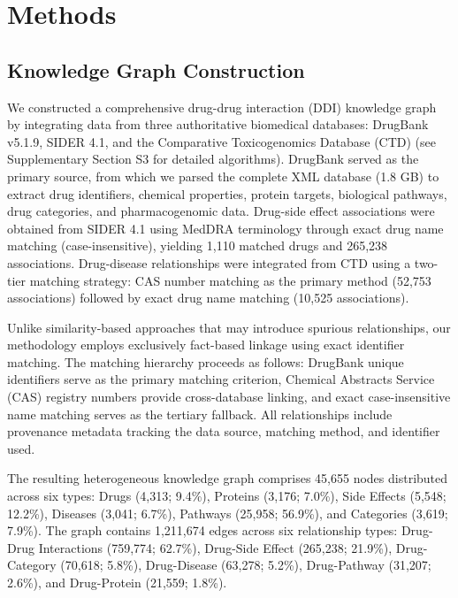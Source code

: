 \documentclass[11pt,a4paper]{article}
\begin{document}
\section*{Methods}

\subsection*{Knowledge Graph Construction}

We constructed a comprehensive drug-drug interaction (DDI) knowledge graph by integrating data from three authoritative biomedical databases: DrugBank v5.1.9, SIDER 4.1, and the Comparative Toxicogenomics Database (CTD) (see Supplementary Section S3 for detailed algorithms). DrugBank served as the primary source, from which we parsed the complete XML database (1.8 GB) to extract drug identifiers, chemical properties, protein targets, biological pathways, drug categories, and pharmacogenomic data. Drug-side effect associations were obtained from SIDER 4.1 using MedDRA terminology through exact drug name matching (case-insensitive), yielding 1,110 matched drugs and 265,238 associations. Drug-disease relationships were integrated from CTD using a two-tier matching strategy: CAS number matching as the primary method (52,753 associations) followed by exact drug name matching (10,525 associations).

Unlike similarity-based approaches that may introduce spurious relationships, our methodology employs exclusively fact-based linkage using exact identifier matching. The matching hierarchy proceeds as follows: DrugBank unique identifiers serve as the primary matching criterion, Chemical Abstracts Service (CAS) registry numbers provide cross-database linking, and exact case-insensitive name matching serves as the tertiary fallback. All relationships include provenance metadata tracking the data source, matching method, and identifier used.

The resulting heterogeneous knowledge graph comprises 45,655 nodes distributed across six types: Drugs (4,313; 9.4\%), Proteins (3,176; 7.0\%), Side Effects (5,548; 12.2\%), Diseases (3,041; 6.7\%), Pathways (25,958; 56.9\%), and Categories (3,619; 7.9\%). The graph contains 1,211,674 edges across six relationship types: Drug-Drug Interactions (759,774; 62.7\%), Drug-Side Effect (265,238; 21.9\%), Drug-Category (70,618; 5.8\%), Drug-Disease (63,278; 5.2\%), Drug-Pathway (31,207; 2.6\%), and Drug-Protein (21,559; 1.8\%).
\end{document}
